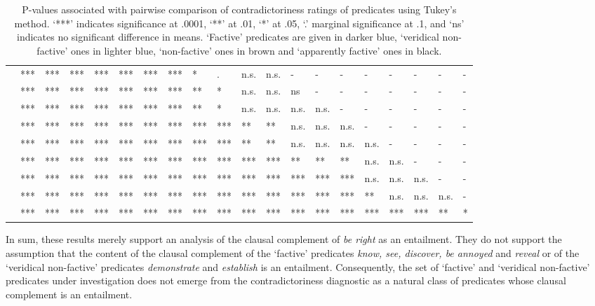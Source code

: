 \documentclass[11pt,fleqn]{article}
\newcommand{\6}{\mbox{$[\hspace*{-.6mm}[$}}
\newcommand{\9}{\mbox{$]\hspace*{-.6mm}]$}}
\begin{document}
{\begin{table}[H]
\begin{tabular}{l l l l l l l l l l l l l l l l l l l l }
\color{black}{\em admit}\color{black}			& *** & *** & *** & *** & *** & *** & *** & * & . & n.s. & n.s. & - & - & - & - & - & - & - & - \\
\color{airforceblue}{\em establish}\color{black}		& *** & *** & *** & *** & *** & *** & *** & ** & * & n.s. & n.s. &  ns & - & - & - & - & - & - & - \\
\color{airforceblue}{\em demonstrate}\color{black}	& *** & *** & *** & *** & *** & *** & *** & ** & * & n.s. & n.s. & n.s. & n.s. & - & - & - & - & - & - \\
\color{black}{\em confirm}\color{black}		& *** & *** & *** & *** & *** & *** & *** & *** & *** & ** & ** & n.s. & n.s. & n.s. & - & - & - & - & - \\
\color{blue}{\em discover}\color{black}		& *** & *** & *** & *** & *** & *** & *** & *** & *** & ** & ** & n.s. & n.s. & n.s. & n.s. & - & - & - & - \\
\color{blue}{\em see}\color{black}			& *** & *** & *** & *** & *** & *** & *** & *** & *** & *** & *** & ** & ** & ** & n.s. & n.s. & - & - & - \\
\color{blue}{\em know}\color{black}			& *** & *** & *** & *** & *** & *** & *** & *** & *** & *** & *** & *** & *** & *** & n.s. & n.s. & n.s. & - & - \\
\color{black}{\em prove}\color{black}			& *** & *** & *** & *** & *** & *** & *** & *** & *** & *** & *** & *** & *** & *** & ** & n.s. & n.s. & n.s. & -  \\
\color{airforceblue}{\em be right}\color{black}		& *** & *** & *** & *** & *** & *** & *** & *** & ***  & ***  & *** & *** & *** & *** & *** & *** & *** & ** & *  \\

\bottomrule
\end{tabular}
\caption{P-values associated with pairwise comparison of contradictoriness ratings of predicates using Tukey's method. `***' indicates significance at .0001, `**' at .01, `*' at .05, `.' marginal significance at .1, and `ns' indicates no significant difference in means. `Factive' predicates are given in darker blue, `veridical non-factive' ones in lighter blue, `non-factive' ones in brown and `apparently factive' ones in black.}\label{t-pairwise}
\end{table}

In sum, these results merely support an analysis of the clausal complement of {\em be right} as an entailment. They do not support the assumption that the content of the clausal complement of the `factive' predicates {\em know, see, discover, be annoyed} and {\em reveal} or of the `veridical non-factive' predicates {\em demonstrate} and {\em establish} is an entailment. Consequently, the set of `factive' and `veridical non-factive' predicates under investigation does not emerge from the contradictoriness diagnostic as a natural class of predicates whose clausal complement is an entailment. 

}
\end{document}
